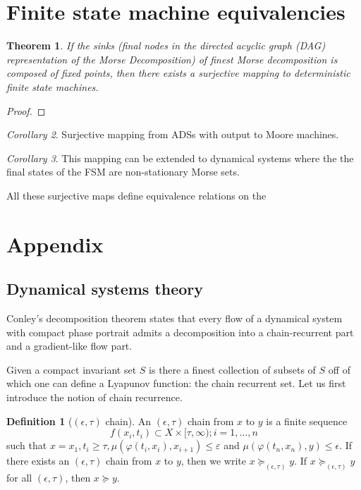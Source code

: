 \documentclass{scrartcl}
\newtheorem{theorem}{Theorem}
\theoremstyle{definition}
\newtheorem{definition}{Definition}
\theoremstyle{remark}
\newtheorem{corollary}[theorem]{Corollary}
\begin{document}
\section{Finite state machine equivalencies}\label{sec:fsm}
\begin{theorem}
If the sinks (final nodes in the directed acyclic graph (DAG) representation of the Morse Decomposition) of finest Morse decomposition is composed of fixed points, then there exists a surjective mapping to deterministic finite state machines.
\end{theorem}

\begin{proof}

\end{proof}

\begin{corollary}
Surjective mapping from ADSs with output to Moore machines.
\end{corollary}

\begin{corollary}
This mapping can be extended to dynamical systems where the  the final states of the FSM are non-stationary Morse sets.
\end{corollary}

All these surjective maps define equivalence relations on the 

\section{Appendix}
\subsection{Dynamical systems theory}\label{sec:dst}

Conley's decomposition theorem states that every flow of a dynamical system with compact phase portrait admits a decomposition into a chain-recurrent part and a gradient-like flow part.


Given a compact invariant set $S$ is there a finest collection of subsets of $S$ off of which one can define a Lyapunov function: the chain recurrent set. Let us first introduce the notion of chain recurrence.

\begin{definition}[$(\epsilon,\tau)$ chain]
An $(\epsilon,\tau)$ chain from $x$ to $y$ is a finite sequence 
\[f(x_i, t_i) \subset  X \times  [\tau,\infty); i = 1, \dots, n\]
such that $x = x_1, t_i\geq \tau, \mu(\varphi(t_i, x_i), x_{i+1})\leq \varepsilon$   and $\mu(\varphi(t_n, x_n), y)\leq \epsilon$.
 If there exists an $(\epsilon,\tau)$ chain from $x$ to $y$, then we write $x \succeq_{(\epsilon,\tau)}y$. If  $x \succeq_{(\epsilon,\tau)}y$ for all $(\epsilon,\tau)$, then  $x \succeq y$.
\end{definition}
\end{document}
